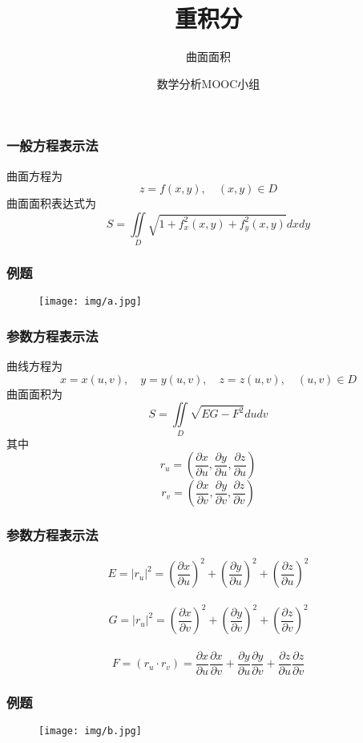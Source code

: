 \documentclass[xetex]{beamer}
\title{重积分}
\subtitle{曲面面积}
\author{数学分析MOOC小组}
\begin{document}
\frame{\maketitle}

\begin{frame}
    \frametitle{一般方程表示法}
    曲面方程为
    $$z=f(x,y), \quad (x,y) \in D$$
    曲面面积表达式为
    $$S = \iint \limits_D \sqrt{1 + f _x ^2 (x,y) + f _y ^2 (x,y)} dxdy$$
\end{frame}

\begin{frame}
    \frametitle{例题}
    \begin{figure}[ht]
        \centering %
       \texttt{[image: img/a.jpg]}
    \end{figure}
\end{frame}

\begin{frame}
    \frametitle{参数方程表示法}
    曲线方程为
    $$x = x(u,v), \quad y=y(u,v), \quad z=z(u,v), \quad (u,v) \in D $$
    曲面面积为
    $$S = \iint \limits_D \sqrt{EG-F^2} dudv$$
    其中
    $$r_u = \left( \dfrac{\partial x} {\partial u} , \dfrac{\partial y} {\partial u} ,\dfrac{\partial z} {\partial u} \right)$$
    $$r_v = \left( \dfrac{\partial x} {\partial v} , \dfrac{\partial y} {\partial v} ,\dfrac{\partial z} {\partial v} \right)$$
\end{frame}

\begin{frame}
    \frametitle{参数方程表示法}
    $$E = | r_u | ^2 = \left( \frac{\partial x} {\partial u} \right) ^2 + \left( \frac{\partial y} {\partial u} \right) ^2 + \left( \frac{\partial z} {\partial u} \right) ^2 $$ \\
    $$G = | r_u | ^2 = \left( \frac{\partial x} {\partial v} \right) ^2 + \left( \frac{\partial y} {\partial v} \right) ^2 + \left( \frac{\partial z} {\partial v} \right) ^2 $$ \\
    $$F = \left( r_u \cdot r_v \right) = \frac{\partial x} {\partial u} \frac{\partial x} {\partial v} + \frac{\partial y} {\partial u} \frac{\partial y} {\partial v} +\frac{\partial z} {\partial u} \frac{\partial z} {\partial v} $$
\end{frame}

\begin{frame}
    \frametitle{例题}
    \begin{figure}[ht]
        \centering %
       \texttt{[image: img/b.jpg]}
    \end{figure}
\end{frame}
\end{document}
